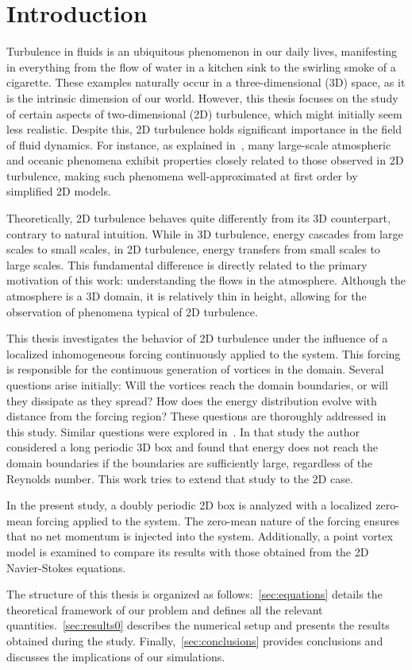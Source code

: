 \documentclass[../main.tex]{subfiles}
\begin{document}
\section{Introduction}
Turbulence in fluids is an ubiquitous phenomenon in our daily lives, manifesting in everything from the flow of water in a kitchen sink to the swirling smoke of a cigarette. These examples naturally occur in a three-dimensional (3D) space, as it is the intrinsic dimension of our world. However, this thesis focuses on the study of certain aspects of two-dimensional (2D) turbulence, which might initially seem less realistic. Despite this, 2D turbulence holds significant importance in the field of fluid dynamics. For instance, as explained in~\cite{2dturbulence}, many large-scale atmospheric and oceanic phenomena exhibit properties closely related to those observed in 2D turbulence, making such phenomena well-approximated at first order by simplified 2D models.

Theoretically, 2D turbulence behaves quite differently from its 3D counterpart, contrary to natural intuition. While in 3D turbulence, energy cascades from large scales to small scales, in 2D turbulence, energy transfers from small scales to large scales. This fundamental difference is directly related to the primary motivation of this work: understanding the flows in the atmosphere. Although the atmosphere is a 3D domain, it is relatively thin in height, allowing for the observation of phenomena typical of 2D turbulence.

This thesis investigates the behavior of 2D turbulence under the influence of a localized inhomogeneous forcing continuously applied to the system. This forcing is responsible for the continuous generation of vortices in the domain. Several questions arise initially: Will the vortices reach the domain boundaries, or will they dissipate as they spread? How does the energy distribution evolve with distance from the forcing region? These questions are thoroughly addressed in this study. Similar questions were explored in~\cite{alexakis}. In that study
the author considered a long periodic 3D box and found that energy does not reach the domain boundaries if the boundaries are sufficiently large, regardless of the Reynolds number. This work tries to extend that study to the 2D case.

In the present study, a doubly periodic 2D box is analyzed with a localized zero-mean forcing applied to the system. The zero-mean nature of the forcing ensures that no net momentum is injected into the system. Additionally, a point vortex model is examined to compare its results with those obtained from the 2D Navier-Stokes equations.

The structure of this thesis is organized as follows:~\cref{sec:equations} details the theoretical framework of our problem and defines all the relevant quantities.~\cref{sec:results0} describes the numerical setup and presents the results obtained during the study. Finally,~\cref{sec:conclusions} provides conclusions and discusses the implications of our simulations.
\end{document}
